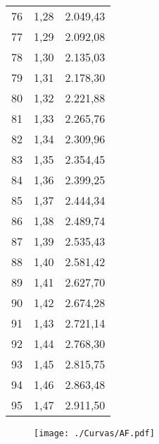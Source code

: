 \documentclass[]{article}
\begin{document}
\begin{longtable}[t]{ccc}
76 & 1,28 & 2.049,43\\
77 & 1,29 & 2.092,08\\
78 & 1,30 & 2.135,03\\
79 & 1,31 & 2.178,30\\
80 & 1,32 & 2.221,88\\
81 & 1,33 & 2.265,76\\
82 & 1,34 & 2.309,96\\
83 & 1,35 & 2.354,45\\
84 & 1,36 & 2.399,25\\
85 & 1,37 & 2.444,34\\
86 & 1,38 & 2.489,74\\
87 & 1,39 & 2.535,43\\
88 & 1,40 & 2.581,42\\
89 & 1,41 & 2.627,70\\
90 & 1,42 & 2.674,28\\
91 & 1,43 & 2.721,14\\
92 & 1,44 & 2.768,30\\
93 & 1,45 & 2.815,75\\
94 & 1,46 & 2.863,48\\
95 & 1,47 & 2.911,50\\*
\end{longtable}

\clearpage

\begin{sidewaysfigure}[htb]
   \centering
   \texttt{[image: ./Curvas/AF.pdf]}
\end{sidewaysfigure}

\clearpage
\end{document}
